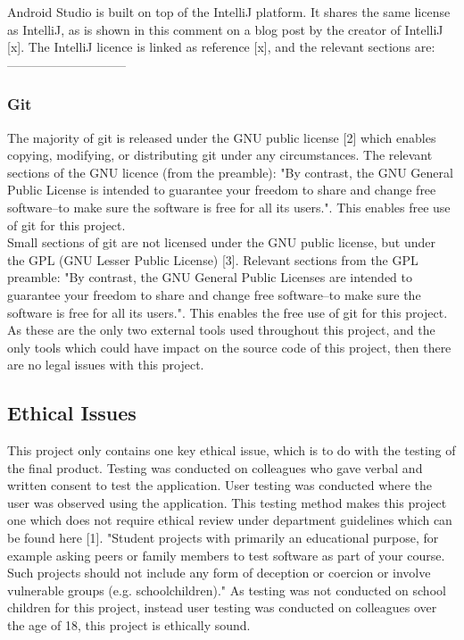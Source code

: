 \documentclass{article}
\begin{document}
Android Studio is built on top of the IntelliJ platform. It shares the same license as IntelliJ, as is shown in this comment on a blog post by the creator of IntelliJ [x]. The IntelliJ licence is linked as reference [x], and the relevant sections are: -----------------------------\\


\subsubsection{Git}

The majority of git is released under the GNU public license [2] which enables copying, modifying, or distributing git under any circumstances. The relevant sections of the GNU licence (from the preamble): "By contrast, the GNU General Public License is intended to guarantee your freedom to share and change free software--to make sure the software is free for all its users.". This enables free use of git for this project. \\

Small sections of git are not licensed under the GNU public license, but under the GPL (GNU Lesser Public License) [3]. Relevant sections from the GPL preamble: "By contrast, the GNU General Public Licenses are intended to guarantee your freedom to share and change free software--to make sure the software is free for all its users.". This enables the free use of git for this project. \\

As these are the only two external tools used throughout this project, and the only tools which could have impact on the source code of this project, then there are no legal issues with this project.

\subsection{Ethical Issues}

This project only contains one key ethical issue, which is to do with the testing of the final product. Testing was conducted on colleagues who gave verbal and written consent to test the application. User testing was conducted where the user was observed using the application. This testing method makes this project one which does not require ethical review under department guidelines which can be found here [1]. "Student projects with primarily an educational purpose, for example asking peers or family members to test software as part of your course. Such projects should not include any form of deception or coercion or involve vulnerable groups (e.g. schoolchildren)." As testing was not conducted on school children for this project, instead user testing was conducted on colleagues over the age of 18, this project is ethically sound. 
\end{document}
